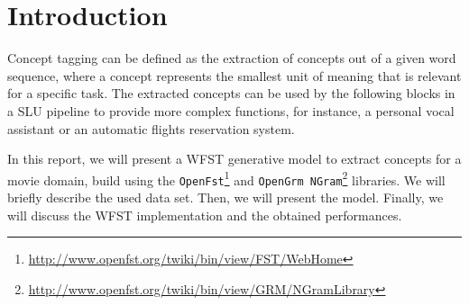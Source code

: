 \section{Introduction}
\label{sec:introduction}

Concept tagging can be defined as the extraction of concepts out of a given word sequence,
where a concept represents the smallest unit of meaning that is relevant for a specific task.
The extracted concepts can be used by the following blocks in a \ac{SLU} pipeline to provide more complex functions, for instance, a personal vocal assistant or an automatic flights reservation system.

In this report, we will present a \ac{WFST} generative model to extract concepts for a movie domain, build using
the \texttt{OpenFst}\footnote{\url{http://www.openfst.org/twiki/bin/view/FST/WebHome}}
and \texttt{OpenGrm NGram}\footnote{\url{http://www.openfst.org/twiki/bin/view/GRM/NGramLibrary}} libraries.
We will briefly describe the used data set.
Then, we will present the model.
Finally, we will discuss the \ac{WFST} implementation and the obtained performances.

